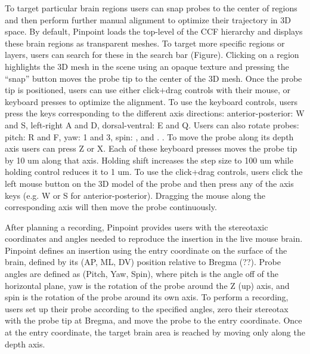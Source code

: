 To target particular brain regions users can snap probes to the center of regions and then perform further manual alignment to optimize their trajectory in 3D space. By default, Pinpoint loads the top-level of the CCF hierarchy and displays these brain regions as transparent meshes. To target more specific regions or layers, users can search for these in the search bar (Figure). Clicking on a region highlights the 3D mesh in the scene using an opaque texture and pressing the ``snap'' button moves the probe tip to the center of the 3D mesh. Once the probe tip is positioned, users can use either click+drag controls with their mouse, or keyboard presses to optimize the alignment. To use the keyboard controls, users press the keys corresponding to the different axis directions: anterior-posterior: W and S, left-right A and D, dorsal-ventral: E and Q. Users can also rotate probes: pitch: R and F, yaw: 1 and 3, spin: , and . . To move the probe along its depth axis users can press Z or X. Each of these keyboard presses moves the probe tip by 10 um along that axis. Holding shift increases the step size to 100 um while holding control reduces it to 1 um. To use the click+drag controls, users click the left mouse button on the 3D model of the probe and then press any of the axis keys (e.g. W or S for anterior-posterior). Dragging the mouse along the corresponding axis will then move the probe continuously.

After planning a recording, Pinpoint provides users with the stereotaxic coordinates and angles needed to reproduce the insertion in the live mouse brain. Pinpoint defines an insertion using the entry coordinate on the surface of the brain, defined by its (AP, ML, DV) position relative to Bregma (??). Probe angles are defined as (Pitch, Yaw, Spin), where pitch is the angle off of the horizontal plane, yaw is the rotation of the probe around the Z (up) axis, and spin is the rotation of the probe around its own axis. To perform a recording, users set up their probe according to the specified angles, zero their stereotax with the probe tip at Bregma, and move the probe to the entry coordinate. Once at the entry coordinate, the target brain area is reached by moving only along the depth axis.


